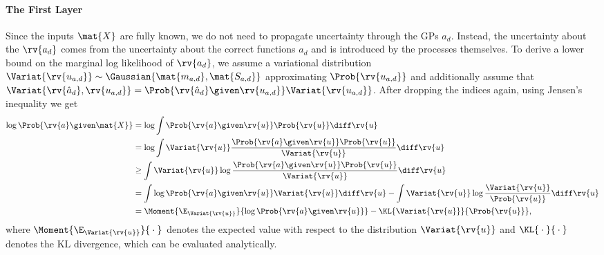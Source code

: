 \documentclass{article}
\begin{document}
\paragraph{The First Layer}
\label{app:subsubsec:first_layer}
Since the inputs $\mat{X}$ are fully known, we do not need to propagate uncertainty through the GPs $a_d$.
Instead, the uncertainty about the $\rv{a_d}$ comes from the uncertainty about the correct functions $a_d$ and is introduced by the processes themselves.
To derive a lower bound on the marginal log likelihood of $\rv{a_d}$, we assume a variational distribution $\Variat{\rv{u_{a, d}}} \sim \Gaussian{\mat{m_{a, d}}, \mat{S_{a, d}}}$ approximating $\Prob{\rv{u_{a, d}}}$ and additionally assume that $\Variat{\rv{\hat{a}_d}, \rv{u_{a, d}}} = \Prob{\rv{\hat{a}_d} \given \rv{u_{a, d}}}\Variat{\rv{u_{a, d}}}$.
After dropping the indices again, using Jensen's inequality we get
\begin{align}
\label{app:eq:svgp_log_likelihood}
\begin{split}
    \log \Prob{\rv{a} \given \mat{X}} &= \log \int \Prob{\rv{a} \given \rv{u}} \Prob{\rv{u}} \diff \rv{u} \\
    &= \log \int \Variat{\rv{u}} \frac{\Prob{\rv{a} \given \rv{u}} \Prob{\rv{u}}}{\Variat{\rv{u}}} \diff \rv{u} \\
    &\geq \int \Variat{\rv{u}} \log \frac{\Prob{\rv{a} \given \rv{u}} \Prob{\rv{u}}}{\Variat{\rv{u}}} \diff \rv{u} \\
    &= \int \log \Prob{\rv{a} \given \rv{u}} \Variat{\rv{u}} \diff \rv{u} - \int \Variat{\rv{u}} \log \frac{\Variat{\rv{u}}}{\Prob{\rv{u}}} \diff \rv{u} \\
    &= \Moment{\E_{\Variat{\rv{u}}}}{\log \Prob{\rv{a} \given \rv{u}}} - \KL{\Variat{\rv{u}}}{\Prob{\rv{u}}},
\end{split}
\end{align}
where $\Moment{\E_{\Variat{\rv{u}}}}{{}\cdot{}}$ denotes the expected value with respect to the distribution $\Variat{\rv{u}}$ and $\KL{{}\cdot{}}{{}\cdot{}}$ denotes the KL divergence, which can be evaluated analytically.
\end{document}

